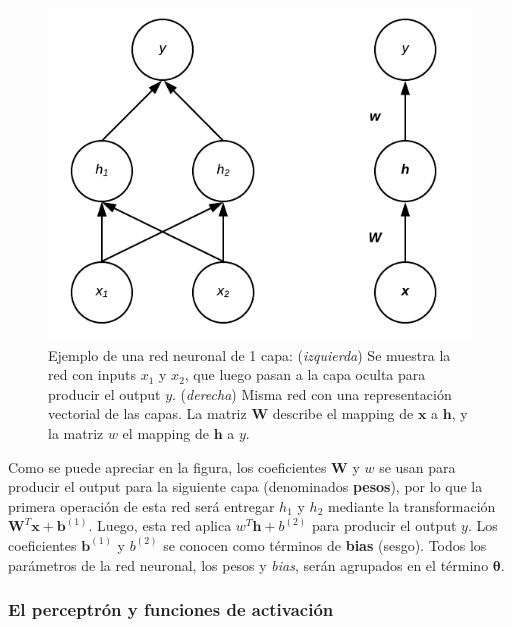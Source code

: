 \begin{figure}[H]
	\captionsetup{font=small,labelfont=small}
	\caption{Ejemplo de una red neuronal de 1 capa: (\textit{izquierda}) Se muestra la red con inputs $x_1$ y $x_2$, que luego pasan a la capa oculta para producir el output $y$. (\textit{derecha}) Misma red con una representaci\'on vectorial de las capas. La matriz ${\bm{W}}$ describe el mapping de ${\bm{x}}$ a ${\bm{h}}$, y la matriz $w$ el mapping de ${\bm{h}}$ a $y$.}
	\centering
	\includegraphics[scale=.5]{img/cap7_F1NN1L.png}
\end{figure}

Como se puede apreciar en la figura, los coeficientes ${\bm{W}}$ y $w$ se usan para producir el output para la siguiente capa (denominados \textbf{pesos}), por lo que la primera operaci\'on de esta red ser\'a entregar $h_{1}$ y $h_{2}$ mediante la transformaci\'on ${\bm{W}^{T}}\bm{x} + \bm{b}^{(1)}$. Luego, esta red aplica $w^{T} \boldsymbol{h} + b^{(2)}$ para producir el output $y$. Los coeficientes $\bm{b}^{(1)}$ y  $b^{(2)}$ se conocen como t\'erminos de \textbf{bias} (sesgo). Todos los parámetros de la red neuronal, los pesos y \textit{bias}, serán agrupados en el t\'ermino $\bm{\theta}$.


\subsubsection{El perceptrón y funciones de activación}


